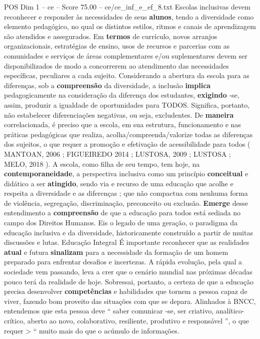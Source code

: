\begin{textsample}{POS Dim 1 – ce – Score 75.00 – ce/ce\_inf\_e\_ef\_8.txt}
Escolas inclusivas devem reconhecer e responder às necessidades de seus \textbf{alunos}, tendo a diversidade como elemento pedagógico, no qual os distintos estilos, ritmos e canais de aprendizagem são atendidos e assegurados.
Em \textbf{termos} de currículo, novos arranjos organizacionais, estratégias de ensino, usos de recursos e parcerias com as comunidades e serviços de áreas complementares e/ou suplementares devem ser disponibilizados de modo a concorrerem ao atendimento das necessidades específicas, peculiares a cada sujeito.
Considerando a abertura da escola para as diferenças, sob a \textbf{compreensão} da diversidade, a inclusão \textbf{implica} pedagogicamente na consideração da diferença dos estudantes, \textbf{exigindo} -se, assim, produzir a igualdade de oportunidades para TODOS.
Significa, portanto, não estabelecer diferenciações negativas, ou seja, excludentes.
De \textbf{maneira} correlacionada, é preciso que a escola, em sua estrutura, funcionamento e nas práticas pedagógicas que realiza, acolha/compreenda/valorize todas as diferenças dos sujeitos, o que requer a promoção e efetivação de acessibilidade para todos ( MANTOAN, 2006 ; FIGUEIREDO 2014 ; LUSTOSA, 2009 ; LUSTOSA ; MELO, 2018 ).
A escola, como filha de seu tempo, tem hoje, na \textbf{contemporaneidade}, a perspectiva inclusiva como um princípio \textbf{conceitual} e didático a ser \textbf{atingido}, sendo via e recurso de uma educação que acolhe e respeita a diversidade e as diferenças ; que não compactua com nenhuma forma de violência, segregação, discriminação, preconceito ou exclusão. \textbf{Emerge} desse entendimento a \textbf{compreensão} de que a educação para todos está sediada no campo dos Direitos Humanos.
Eis o legado de uma geração, o paradigma da educação inclusiva e da diversidade, historicamente construído a partir de muitas discussões e lutas.
Educação Integral É importante reconhecer que as realidades \textbf{atual} e futura \textbf{sinalizam} para a necessidade da formação de um homem preparado para enfrentar desafios e incertezas.
A rápida evolução, pela qual a sociedade vem passando, leva a crer que o cenário mundial nas próximas décadas pouco terá da realidade de hoje.
Sobressai, portanto, a certeza de que a educação precisa desenvolver \textbf{competências} e habilidades que tornem a pessoa capaz de viver, fazendo bom proveito das situações com que se depara.
Alinhados à BNCC, entendemos que esta pessoa deve “ saber comunicar -se, ser criativo, analítico-crítico, aberto ao novo, colaborativo, resiliente, produtivo e responsável ”, o que requer > “ muito mais do que o acúmulo de informações.

\end{textsample}
